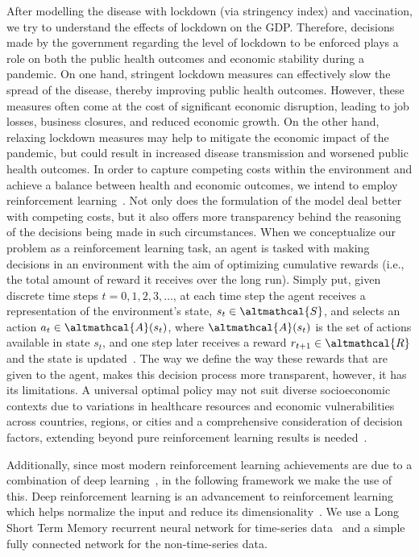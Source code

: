 \documentclass[tikz,fleqn,12pt]{wlscirep}
\begin{document}
After modelling the disease with lockdown (via stringency index) and vaccination, we try to understand the effects of lockdown on the GDP. Therefore, decisions made by the government regarding the level of lockdown to be enforced plays a role on both the public health outcomes and economic stability during a pandemic. On one hand, stringent lockdown measures can effectively slow the spread of the disease, thereby improving public health outcomes. However, these measures often come at the cost of significant economic disruption, leading to job losses, business closures, and reduced economic growth. On the other hand, relaxing lockdown measures may help to mitigate the economic impact of the pandemic, but could result in increased disease transmission and worsened public health outcomes. In order to capture competing costs within the environment and achieve a balance between health and economic outcomes, we intend to employ reinforcement learning~\cite{Nguyen2022,Bastani2021,Song2022,Ohi2020,PADMANABHAN2021102676}. Not only does the formulation of the model deal better with competing costs, but it also offers more transparency behind the reasoning of the decisions being made in such circumstances. When we conceptualize our problem as a reinforcement learning task, an agent is tasked with making decisions in an environment with the aim of optimizing cumulative rewards (i.e., the total amount of reward it receives over the long run). Simply put, given discrete time steps $t = 0, 1, 2, 3, \dots$, at each time step the agent receives a representation of the environment's state, $s_t \in \altmathcal{S}$, and selects an action $a_t \in \altmathcal{A}(s_t)$, where $\altmathcal{A}(s_t)$ is the set of actions available in state $s_t$, and one step later receives a reward $r_{t+1} \in \altmathcal{R}$ and the state is updated~\cite{sutton2018reinforcement}. The way we define the way these rewards that are given to the agent, makes this decision process more transparent, however, it has its limitations. A universal optimal policy may not suit diverse socioeconomic contexts due to variations in healthcare resources and economic vulnerabilities across countries, regions, or cities and a comprehensive consideration of decision factors, extending beyond pure reinforcement learning results is needed~\cite{Song2022,Dunn2017,Demir2006}.

Additionally, since most modern reinforcement learning achievements are due to a combination of deep learning~\cite{Mnih2015}, in the following framework we make the use of this. Deep reinforcement learning is an advancement to reinforcement learning which helps normalize the input and reduce its dimensionality~\cite{Lavet2018,Arulkumaran2017,Henderson_Islam_Bachman_Pineau_Precup_Meger_2018,Mnih2015}. We use a Long Short Term Memory recurrent neural network for time-series data~\cite{NIPS2001_a38b1617,LSTM} and a simple fully connected network for the non-time-series data.
\end{document}
